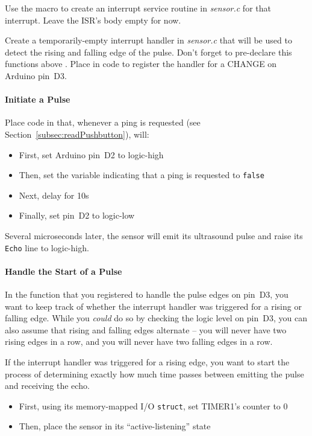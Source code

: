 Use the  macro to create an interrupt service routine in \textit{sensor.c} for that interrupt.
Leave the ISR's body empty for now.

Create a temporarily-empty interrupt handler in \textit{sensor.c} that will be used to detect the rising and falling edge of the pulse. %
Don't forget to pre-declare this functions above .
Place in  code to register the handler for a CHANGE on Arduino pin~D3.

\paragraph{Initiate a Pulse}
Place code in  that, whenever a ping is requested (see Section~\ref{subsec:readPushbutton}), will:
\begin{itemize}
    \item First, set Arduino pin~D2 to logic-high
    \item Then, set the variable indicating that a ping is requested to \lstinline{false}
    \item Next, delay for 10\textmu s
    \item Finally, set pin~D2 to logic-low
\end{itemize}

Several microseconds later, the sensor will emit its ultrasound pulse and raise its \texttt{Echo} line to logic-high.

\paragraph{Handle the Start of a Pulse}
In the function that you registered to handle the pulse edges on pin~D3, you want to keep track of whether the interrupt handler was triggered for a rising or falling edge.
While you \textit{could} do so by checking the logic level on pin~D3, you can also assume that rising and falling edges alternate --
you will never have two rising edges in a row, and you will never have two falling edges in a row.

If the interrupt handler was triggered for a rising edge, you want to start the process of determining exactly how much time passes between emitting the pulse and receiving the echo.
\begin{itemize}
    \item First, using its memory-mapped I/O \lstinline{struct}, set TIMER1's counter to 0
    \item Then, place the sensor in its ``active-listening'' state
\end{itemize}

